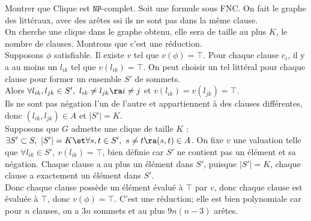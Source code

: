 \documentclass[french, 11pt]{article}
\newcommand*{\NP}{\texttt{NP}}
\begin{document}
\begin{ex}{}{}
    Montrer que Clique est $\NP$-complet.
    \tcblower
    Soit une formule sous FNC. On fait le graphe des littéraux, avec des arêtes ssi ils ne sont pas dans la même clause.\\
    On cherche une clique dans le graphe obtenu, elle sera de taille au plus $K$, le nombre de clauses. Montrons que c'est une réduction.\\
    \boxed{\ra} Supposons $\phi$ satisfiable. Il existe $v$ tel que $v(\phi)=\top$. Pour chaque clause $c_i$, il y a au moins un $l_{ik}$ tel que $v(l_{ik})=\top$. On peut choisir un tel littéral pour chaque clause pour former un ensemble $S'$ de sommets.\\
    Alors $\forall l_{ik}, l_{jk} \in S', ~ l_{ik}\neq l_{jk} \ra i \neq j$ et $v(l_{ik})=v(l_{jk})=\top$.\\
    Ils ne sont pas négation l'un de l'autre et appartiennent à des clauses différentes, donc $(l_{ik}, l_{jk})\in A$ et $|S'|=K$.\\
    \boxed{\la} Supposons que $G$ admette une clique de taille $K$ : $\exists S' \subset S, ~ |S'|=K \et \forall s,t \in S', ~ s\neq t \ra (s,t)\in A$.
    On fixe $v$ une valuation telle que $\forall l_{ik}\in S', ~ v(l_{ik})=\top$, bien définie car $S'$ ne contient pas un élément et sa négation.
    Chaque clause a au plus un élément dans $S'$, puisque $|S'|=K$, chaque clause a exactement un élément dans $S'$.\\
    Donc chaque clause possède un élément évalué à $\top$ par $v$, donc chaque clause est évaluée à $\top$, donc $v(\phi)=\top$.\n
    C'est une réduction; elle est bien polynomiale car pour $n$ clauses, on a $3n$ sommets et au plus $9n(n-3)$ arêtes.
\end{ex}
\end{document}
